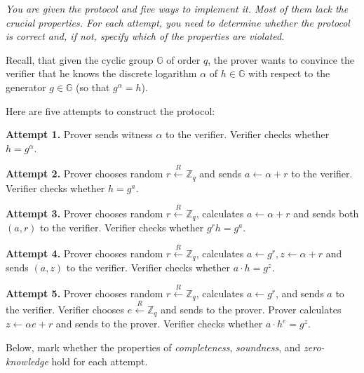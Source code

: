 \documentclass[../lecture-notes.tex]{subfiles}
\begin{document}
\begin{tcolorbox}[colback=gray!10!white,fonttitle=\bfseries,colframe=purple!80!black,title=Exercises 1-5. In search of correct Schnorr's Identification Protocol\ldots]
    \textit{You are given the protocol and five ways to implement it. Most of them lack the crucial properties. For each attempt, you need to determine whether the protocol is correct and, if not, specify which of the properties are violated.}
    \vspace{10px}
 
    Recall, that given the cyclic group $\mathbb{G}$ of order $q$, the prover wants to convince the verifier that he knows the discrete logarithm $\alpha$ of $h \in \mathbb{G}$ with respect to the generator $g \in \mathbb{G}$ (so that $g^{\alpha}=h$).

    Here are five attempts to construct the protocol:

    \textcolor{purple!80!black}{\textbf{Attempt 1.}} Prover sends witness $\alpha$ to the verifier. Verifier checks whether $h = g^{\alpha}$.

    \textcolor{purple!80!black}{\textbf{Attempt 2.}} Prover chooses random $r \xleftarrow{R} \mathbb{Z}_q$ and sends $a \gets \alpha + r$ to the verifier. Verifier checks whether $h = g^a$.

    \textcolor{purple!80!black}{\textbf{Attempt 3.}} Prover chooses random $r \xleftarrow{R} \mathbb{Z}_q$, calculates $a \gets \alpha + r$ and sends both $(a,r)$ to the verifier. Verifier checks whether $g^r h = g^a$.

    \textcolor{purple!80!black}{\textbf{Attempt 4.}} Prover chooses random $r \xleftarrow{R} \mathbb{Z}_q$, calculates $a \gets g^r, z \gets \alpha+r$ and sends $(a,z)$ to the verifier. Verifier checks whether $a \cdot h = g^z$.

    \textcolor{purple!80!black}{\textbf{Attempt 5.}} Prover chooses random $r \xleftarrow{R} \mathbb{Z}_q$, calculates $a \gets g^r$, and sends $a$ to the verifier. Verifier chooses $e \xleftarrow{R} \mathbb{Z}_q$ and sends to the prover. Prover calculates $z \gets \alpha e + r$ and sends to the prover. Verifier checks whether $a \cdot h^e = g^z$.

    \vspace{10px}

    Below, mark whether the properties of \textit{completeness}, \textit{soundness}, and \textit{zero-knowledge} hold for each attempt.


\end{tcolorbox}
\end{document}
